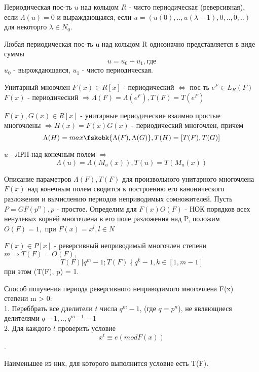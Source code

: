 \begin{defs}
Периодическая пос-ть $u$ над кольцом $R$ - чисто периодическая (реверсивная), если $\Lambda(u) = 0$ и выраждающаяся, если $u = (u(0),..,u(\lambda-1), 0,..,0,..)$ для некоторго $\lambda \in N_0$.
\end{defs} 

\begin{proofs}
Любая периодическая пос-ть u над кольцом R однозначно представляется в виде суммы 
$$u = u_0 + u_1, где$$
$u_0$ - вырождающаяся, $u_1$ - чисто периодическая.
\end{proofs}

\begin{proofs}
Унитарный мноочлен $F(x) \in R[x]$ - периодический $\Leftrightarrow$ пос-ть $e^F \in L_R(F)$
\\$F(x)$ - периодический $\Rightarrow \Lambda(F) = \Lambda(e^F),  T(F) = T(e^F)$ 
\end{proofs}

\begin{proofs}
$F(x), G(x) \in R[x]$ - унитарные периодические взаимно простые многочлены $\Rightarrow H(x) = F(x)G(x)$ - периодический многочлен, причем
$$\Lambda(H) = max \fskobk{\Lambda(F), \Lambda(G)}, T(H) = [T(F), T(G)]$$
\end{proofs}

\begin{proofs}
$u$ - ЛРП над конечным полем $\Rightarrow$
$$\Lambda(u) = \Lambda(M_u(x)), T(u) = T(M_u(x))$$
\end{proofs}

\begin{defs}
Описание параметров $\Lambda(F), T(F)$ для произвольного унитарного многочлена $F(x)$ над конечным полем сводится к построению его канонического разложения и вычислению периодов неприводимых сомножителей. Пусть $P = GF(p^n), p$ - простое. Определим для $F(x) O(F)$ - НОК порядков всех ненулевых корней многочлена в его поле разложения над P, положим $O(F) = 1,$ при $F(x) = x^l, l \in N$ 
\end{defs}

\begin{proofs}
$F(x) \in P[x]$ - реверсивный неприводимый многочлен степени $m \Rightarrow T(F) = O(F),$
$$T(F) | q^m - 1; T(F) \nmid q^k - 1, k \in [1, m-1]$$ 
при этом (T(F), p) = 1.
\end{proofs}

\begin{defs}
Способ получения периода реверсивного неприводимого многочлена F(x) степени m > 0:
\\1. Переббрать все длелители $t$ числа $q^m - 1$, (где $q = p^n$), не являющиеся делителями $q-1,.., q^{m-1} - 1$ 
\\2. Для каждого $t$ проверить условие 
$$x^t \equiv e (mod F(x))$$.

Наименьшее из них, для которого выполнится условие есть T(F). 
\end{defs}

